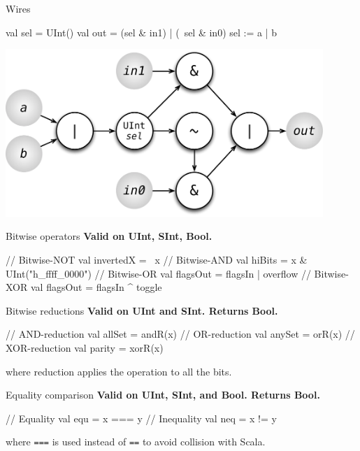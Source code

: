 \documentclass[xcolor=pdflatex,dvipsnames,table]{beamer}
\begin{document}
\begin{frame}[fragile]{Wires}

\begin{scala}
val sel = UInt()
val out = (sel & in1) | (~sel & in0)
sel := a | b
\end{scala}

\begin{center}
\includegraphics[width=0.9\textwidth]{figs/mux2-forward-sel.pdf} 
\end{center}

\end{frame}

\begin{frame}[fragile]{Bitwise operators}
\textbf{Valid on UInt, SInt, Bool.}
\begin{scala}
// Bitwise-NOT
val invertedX = ~x                      
// Bitwise-AND 
val hiBits    = x & UInt("h_ffff_0000") 
// Bitwise-OR
val flagsOut  = flagsIn | overflow      
// Bitwise-XOR
val flagsOut  = flagsIn ^ toggle        
\end{scala}
\end{frame}

\begin{frame}[fragile]{Bitwise reductions}
\textbf{Valid on UInt and SInt.  Returns Bool.}
\begin{scala}
// AND-reduction 
val allSet = andR(x)  
// OR-reduction
val anySet = orR(x)   
// XOR-reduction 
val parity = xorR(x)  
\end{scala}
\noindent
where reduction applies the operation to all the bits.
\end{frame}

\begin{frame}[fragile]{Equality comparison}
\textbf{Valid on UInt, SInt, and Bool. Returns Bool.}
\begin{scala}
// Equality
val equ = x === y 
// Inequality 
val neq = x != y   
\end{scala}
\noindent
where \verb+===+ is used instead of \verb+==+ to avoid collision with Scala.
\end{frame}
\end{document}
